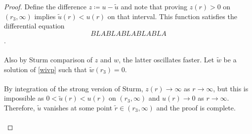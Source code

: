 \begin{lemma}
\begin{proof}
Define the difference $z\coloneqq u-\tilde u$ and note that proving $z(r)>0$ on $(r_3,\infty)$ implies $\tilde u(r)<u(r)$ on that interval. This function satisfies the differential equation $$\label{zivp} BLABLABLABLABLA $$.
\\
\\
Also by Sturm comparison of $z$ and $w$, the latter oscillates faster. Let $\tilde w$ be a solution of \eqref{wivp} such that $\tilde w(r_3)=0$. 
\\
\\
By integration of the strong version of Sturm, $z(r)\to\infty$ as $r\to\infty$, but this is impossible as $0<\tilde u(r)<u(r)$ on $(r_3,\infty)$ and $u(r)\to0$ as $r\to\infty$. Therefore, $\tilde u$ vanishes at some point $\tilde r\in(r_3,\infty)$ and the proof is complete.
\\
\\  \end{proof}
\end{lemma}


